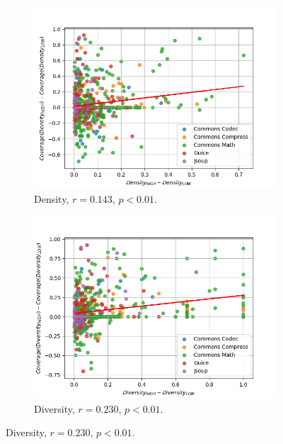 \documentclass[twoside,a4paper,11pt]{memoir}
\begin{document}
\begin{figure}
    \centering
    \begin{subfigure}[b]{0.49\linewidth}
        \centering
        \includegraphics[width=\linewidth]{figures/delta_coverage_density}
        \caption{Density, \(r=0.143 \), \(p<0.01 \).}%
        \label{fig:delta_coverage_density}
    \end{subfigure}
    \hfill
    \begin{subfigure}[b]{0.49\linewidth}
        \centering
        \includegraphics[width=\linewidth]{figures/delta_coverage_diversity}
        \caption{Diversity, \(r=0.230 \), \(p < 0.01 \).}%
        \label{fig:delta_coverage_diversity}
    \end{subfigure}

\end{figure}
\end{document}
